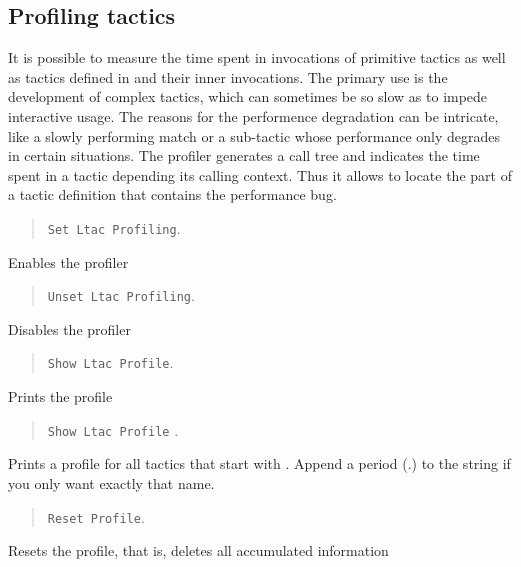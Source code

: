 \subsection[Profiling {\ltac} tactics]{Profiling {\ltac} tactics}

It is possible to measure the time spent in invocations of primitive tactics as well as tactics defined in {\ltac} and their inner invocations. The primary use is the development of complex tactics, which can sometimes be so slow as to impede interactive usage. The reasons for the performence degradation can be intricate, like a slowly performing {\ltac} match or a sub-tactic whose performance only degrades in certain situations. The profiler generates a call tree and indicates the time spent in a tactic depending its calling context. Thus it allows to locate the part of a tactic definition that contains the performance bug.

\begin{quote}
{\tt Set Ltac Profiling}.
\end{quote}
Enables the profiler

\begin{quote}
{\tt Unset Ltac Profiling}.
\end{quote}
Disables the profiler

\begin{quote}
{\tt Show Ltac Profile}.
\end{quote}
Prints the profile

\begin{quote}
{\tt Show Ltac Profile} {\qstring}.
\end{quote}
Prints a profile for all tactics that start with {\qstring}. Append a period (.) to the string if you only want exactly that name.

\begin{quote}
{\tt Reset Profile}.
\end{quote}
Resets the profile, that is, deletes all accumulated information

